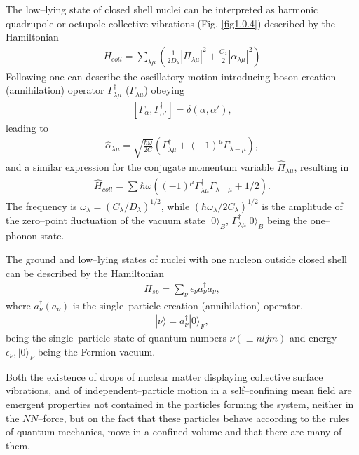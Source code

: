 \documentclass[a4paper,11pt]{book}
\numberwithin{equation}{section}
\numberwithin{figure}{section}
\numberwithin{table}{section}
\newcommand{\ket}[1]{|{#1} \rangle }
\begin{document}
The low--lying state of closed shell nuclei can be interpreted as harmonic quadrupole or octupole collective vibrations (Fig. \ref{fig1.0.4}) described by the Hamiltonian
\begin{align}\label{eq1.0.7}
H_{coll}=\sum_{\lambda\mu}\left(\frac{1}{2D_{\lambda}}|\Pi_{\lambda\mu}|^2+\frac{C_\lambda}{2}|\alpha_{\lambda\mu}|^2\right)
\end{align}
Following \cite{Dirac:26} one can describe the oscillatory motion introducing boson creation (annihilation) operator $\Gamma_{\lambda\mu}^\dagger$ ($\Gamma_{\lambda\mu}$) obeying
\begin{align}\label{eq1.0.8}
\left[\Gamma_{\alpha},\Gamma_{\alpha'}^\dagger\right]=\delta(\alpha,\alpha'),
\end{align}
leading to 
\begin{align}\label{eq1.0.9}
\hat\alpha_{\lambda\mu}=\sqrt{\frac{\hbar\omega}{2C}}\left(\Gamma_{\lambda\mu}^\dagger+(-1)^\mu\Gamma_{\lambda-\mu}\right),
\end{align}
and a similar expression for the conjugate momentum variable $\hat\Pi_{\lambda\mu}$, resulting in 
\begin{align}\label{eq1.0.9b}
\hat H_{coll}=\sum\hbar\omega\left((-1)^\mu\Gamma_{\lambda\mu}^\dagger\Gamma_{\lambda-\mu}+1/2\right).
\end{align}
The frequency is $\omega_\lambda=(C_\lambda/D_\lambda)^{1/2}$, while $(\hbar\omega_\lambda/2C_\lambda)^{1/2}$ is the amplitude of the zero--point fluctuation of the vacuum state $\ket{0}_B$, $\Gamma_{\lambda\mu}^\dagger \ket{0}_B$ being the one--phonon state.

The ground and low--lying states of nuclei with one nucleon outside closed shell can be described by the Hamiltonian
\begin{align}\label{eq1.0.10}
H_{sp}=\sum_{\nu}\epsilon_\nu a_\nu^\dagger a_\nu,
\end{align}
where $a_\nu^\dagger (a_\nu)$ is the single--particle creation (annihilation) operator,
\begin{align}\label{eq1.0.11}
\ket{\nu}=a_\nu^\dagger\ket{0}_F,
\end{align}
being the single--particle state of quantum numbers $\nu(\equiv nljm)$ and energy $\epsilon_\nu,\ket{0}_F$ being the Fermion vacuum. 

Both the existence of drops of nuclear matter displaying collective surface vibrations, and of independent--particle motion in a self--confining mean field are emergent properties not contained in the particles forming the system, neither in the $NN$--force, but on the fact that these particles behave according to the rules of quantum mechanics, move in a confined volume and that there are many of them.
\end{document}

